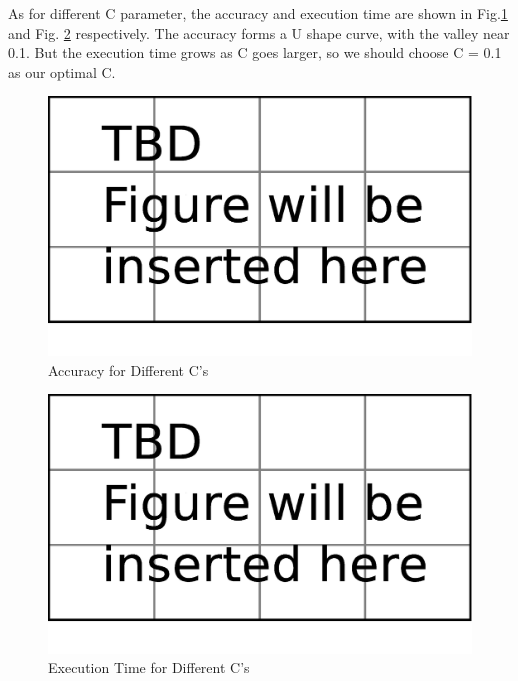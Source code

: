 As for different C parameter, the accuracy and execution time are shown in Fig.\ref{fig:c_accu} and Fig. \ref{fig:c_time} respectively. The accuracy forms a U shape curve, with the valley near 0.1. But the execution time grows as C goes larger, so we should choose C = 0.1 as our optimal C.

\begin{figure}[tp]
   \begin{center}
      \includegraphics[width=\textwidth]{fig/TBDFigure}

   \end{center}
   \caption{Accuracy for Different C's}
   \label{fig:c_accu}
\end{figure}
\begin{figure}[tp]
   \begin{center}
      \includegraphics[width=\textwidth]{fig/TBDFigure}

   \end{center}
   \caption{Execution Time for Different C's}
   \label{fig:c_time}
\end{figure}
